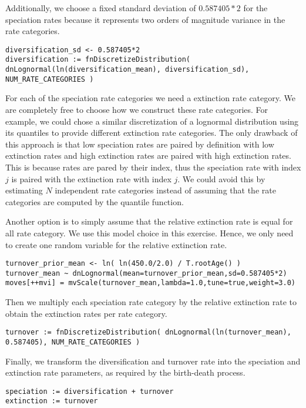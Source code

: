 Additionally, we choose a fixed standard deviation of $0.587405*2$ for the speciation rates because it represents two orders of magnitude variance in the rate categories.
{\tt \begin{snugshade*}
\begin{lstlisting}
diversification_sd <- 0.587405*2
diversification := fnDiscretizeDistribution( dnLognormal(ln(diversification_mean), diversification_sd), NUM_RATE_CATEGORIES )
\end{lstlisting}
\end{snugshade*}}
For each of the speciation rate categories we need a extinction rate category.
We are completely free to choose how we construct these rate categories.
For example, we could chose a similar discretization of a lognormal distribution using its quantiles to provide different extinction rate categories.
The only drawback of this approach is that low speciation rates are paired by definition with low extinction rates and high extinction rates are paired with high extinction rates.
This is because rates are pared by their index, thus the speciation rate with index $j$ is paired with the extinction rate with index $j$.
We could avoid this by estimating $N$ independent rate categories instead of assuming that the rate categories are computed by the quantile function.

Another option is to simply assume that the relative extinction rate is equal for all rate category.
We use this model choice in this exercise.
Hence, we only need to create one random variable for the relative extinction rate.
{\tt \begin{snugshade*}
\begin{lstlisting}
turnover_prior_mean <- ln( ln(450.0/2.0) / T.rootAge() )
turnover_mean ~ dnLognormal(mean=turnover_prior_mean,sd=0.587405*2) 
moves[++mvi] = mvScale(turnover_mean,lambda=1.0,tune=true,weight=3.0)
\end{lstlisting}
\end{snugshade*}}
Then we multiply each speciation rate category by the relative extinction rate to obtain the extinction rates per rate category.
{\tt \begin{snugshade*}
\begin{lstlisting}
turnover := fnDiscretizeDistribution( dnLognormal(ln(turnover_mean), 0.587405), NUM_RATE_CATEGORIES )
\end{lstlisting}
\end{snugshade*}}
Finally, we transform the diversification and turnover rate into the speciation and extinction rate parameters, as required by the birth-death process.
{\tt \begin{snugshade*}
\begin{lstlisting}
speciation := diversification + turnover
extinction := turnover 
\end{lstlisting}
\end{snugshade*}}

